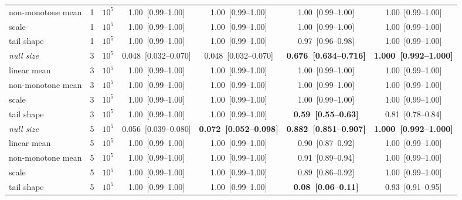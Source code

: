 {\begin{tabular}{llrcccc}
non-monotone mean & 1 & $10^5$ & 1.00~[0.99--1.00] & 1.00~[0.99--1.00] & 1.00~[0.99--1.00] & 1.00~[0.99--1.00] \\
scale & 1 & $10^5$ & 1.00~[0.99--1.00] & 1.00~[0.99--1.00] & 1.00~[0.99--1.00] & 1.00~[0.99--1.00] \\
tail shape & 1 & $10^5$ & 1.00~[0.99--1.00] & 1.00~[0.99--1.00] & 0.97~[0.96--0.98] & 1.00~[0.99--1.00] \\
\midrule
\emph{null size} & 3 & $10^5$ & 0.048~[0.032--0.070] & 0.048~[0.032--0.070] & \textbf{0.676~[0.634--0.716]} & \textbf{1.000~[0.992--1.000]} \\
linear mean & 3 & $10^5$ & 1.00~[0.99--1.00] & 1.00~[0.99--1.00] & 1.00~[0.99--1.00] & 1.00~[0.99--1.00] \\
non-monotone mean & 3 & $10^5$ & 1.00~[0.99--1.00] & 1.00~[0.99--1.00] & 1.00~[0.99--1.00] & 1.00~[0.99--1.00] \\
scale & 3 & $10^5$ & 1.00~[0.99--1.00] & 1.00~[0.99--1.00] & 1.00~[0.99--1.00] & 1.00~[0.99--1.00] \\
tail shape & 3 & $10^5$ & 1.00~[0.99--1.00] & 1.00~[0.99--1.00] & \textbf{0.59~[0.55--0.63]} & 0.81~[0.78--0.84] \\
\midrule
\emph{null size} & 5 & $10^5$ & 0.056~[0.039--0.080] & \textbf{0.072~[0.052--0.098]} & \textbf{0.882~[0.851--0.907]} & \textbf{1.000~[0.992--1.000]} \\
linear mean & 5 & $10^5$ & 1.00~[0.99--1.00] & 1.00~[0.99--1.00] & 0.90~[0.87--0.92] & 1.00~[0.99--1.00] \\
non-monotone mean & 5 & $10^5$ & 1.00~[0.99--1.00] & 1.00~[0.99--1.00] & 0.91~[0.89--0.94] & 1.00~[0.99--1.00] \\
scale & 5 & $10^5$ & 1.00~[0.99--1.00] & 1.00~[0.99--1.00] & 0.89~[0.86--0.92] & 1.00~[0.99--1.00] \\
tail shape & 5 & $10^5$ & 1.00~[0.99--1.00] & 1.00~[0.99--1.00] & \textbf{0.08~[0.06--0.11]} & 0.93~[0.91--0.95] \\
\bottomrule
\end{tabular}}

